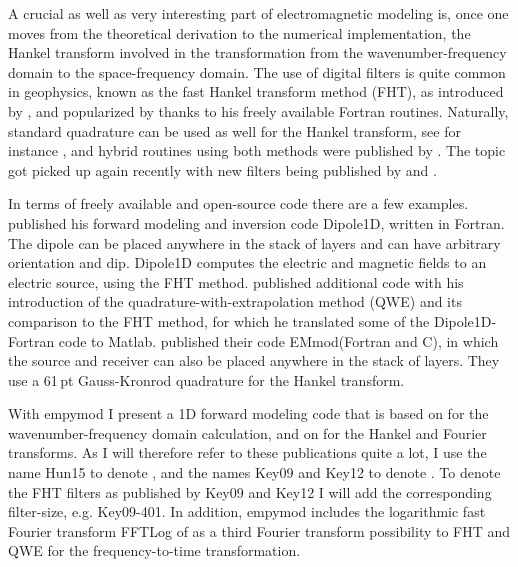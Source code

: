 \documentclass[manuscript]{geophysics}
\newcommand{\tnt}[1]{#1}
\newcommand{\fortran}{\tnt{Fortran}\xspace}
\newcommand{\matlab}{\tnt{Matlab}\xspace}
\newcommand{\cc}{\tnt{C}\xspace}
\newcommand{\emmod}{\tnt{EMmod}\xspace}
\newcommand{\empymod}{\tnt{empymod}\xspace}
\newcommand{\fftlog}{\tnt{FFTLog}\xspace}
\newcommand{\dipole}{\tnt{Dipole1D}\xspace}
\begin{document}
A crucial as well as very interesting part of electromagnetic modeling is,
once one moves from the theoretical derivation to the numerical implementation,
the Hankel transform involved in the transformation from the
wave\-num\-ber-fre\-que\-ncy domain to the space-frequency domain. The use of
digital filters is quite common in geophysics, known as the fast Hankel
transform method (FHT), as introduced by \cite{GP.71.Gosh}, and popularized by
\cite{TRP.75.Anderson, GEO.79.Anderson, TMS.82.Anderson} thanks to his freely
available \fortran routines. Naturally, standard quadrature can be used as well
for the Hankel transform, see for instance \cite{GEO.83.Chave}, and hybrid
routines using both methods were published by \cite{GEO.84.Anderson,
GEO.89.Anderson}. The topic got picked up again recently with new filters being
published by \cite{GP.07.Kong} and \cite{GEO.12.Key}.

In terms of freely available and open-source code there are a few examples.
\cite{GEO.09.Key} published his forward modeling and inversion code \dipole,
written in \fortran. The dipole can be placed anywhere in the stack of layers
and can have arbitrary orientation and dip. \dipole computes the electric and
magnetic fields to an electric source, using the FHT method. \cite{GEO.12.Key}
published additional code with his introduction of the
qua\-dra\-ture-with-ex\-tra\-po\-la\-tion method (QWE) and its comparison to
the FHT method, for which he translated some of the \dipole-\fortran code to
\matlab. \cite{GEO.15.Hunziker} published their code \emmod (\fortran and \cc),
in which the source and receiver can also be placed anywhere in the stack of
layers. They use a 61\,pt Gauss-Kronrod quadrature for the Hankel transform.

With \empymod I present a 1D forward modeling code that is based on
\cite{GEO.15.Hunziker} for the wavenumber-frequency domain calculation, and on
\cite{GEO.12.Key} for the Hankel and Fourier transforms. As I will therefore
refer to these publications quite a lot, I use the name Hun15 to denote
\cite{GEO.15.Hunziker}, and the names Key09 and Key12 to denote
\cite{GEO.09.Key, GEO.12.Key}. To denote the FHT filters as published by Key09
and Key12 I will add the corresponding filter-size, e.g. Key09-401.
In addition, \empymod includes the logarithmic fast Fourier transform \fftlog
of \cite{RAS.00.Hamilton} as a third Fourier transform possibility to FHT and
QWE for the frequency-to-time transformation.
\end{document}
